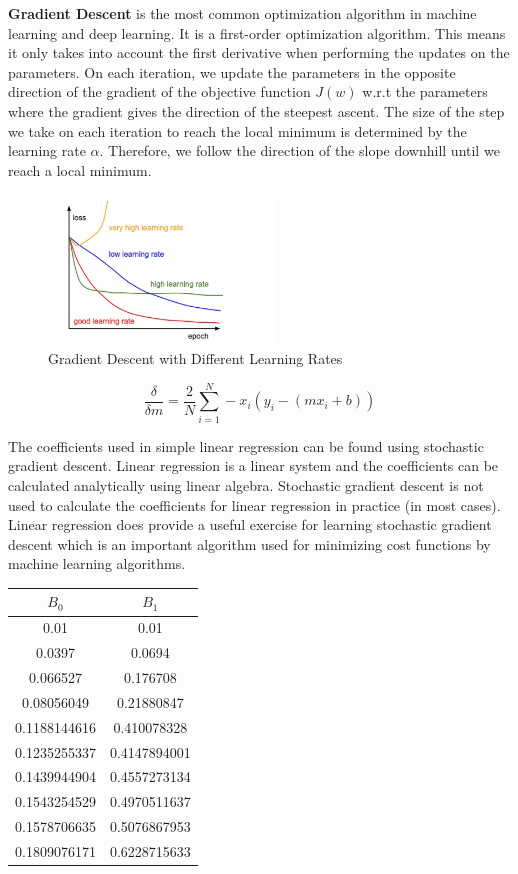 \documentclass[conference,compsoc]{IEEEtran}
\begin{document}
\textbf{Gradient Descent} is the most common optimization algorithm in machine learning and deep learning. It is a first-order optimization algorithm. This means it only takes into account the first derivative when performing the updates on the parameters. On each iteration, we update the parameters in the opposite direction of the gradient of the objective function $J(w)$ w.r.t the parameters where the gradient gives the direction of the steepest ascent. The size of the step we take on each iteration to reach the local minimum is determined by the learning rate $α$. Therefore, we follow the direction of the slope downhill until we reach a local minimum.

\begin{figure}[H]
    \centering
    \includegraphics[width=6cm]{images/gradient-descent-different-learning-rates.png}
    \caption{Gradient Descent with Different Learning Rates}
\end{figure}

\[
    \frac{\delta}{\delta m} = \frac{2}{N} \sum_{i=1}^{N} - x_{i}(y_{i} - (mx_{i} +b))
\]

The coefficients used in simple linear regression can be found using stochastic gradient descent. Linear regression is a linear system and the coefficients can be calculated analytically using linear algebra. Stochastic gradient descent is not used to calculate the coefficients for linear regression in practice (in most cases). Linear regression does provide a useful exercise for learning stochastic gradient descent which is an important algorithm used for minimizing cost functions by machine learning algorithms.

\begin{center}
\begin{tabular}{|c|c|}
    \hline
    $B_{0}$ & $B_{1}$ \\ [0.5ex]
    \hline\hline
    0.01 & 0.01 \\
    \hline
    0.0397 & 0.0694 \\
    \hline
    0.066527 & 0.176708 \\
    \hline
    0.08056049 & 0.21880847 \\
    \hline
    0.1188144616 & 0.410078328 \\
    \hline
    0.1235255337 & 0.4147894001 \\
    \hline
    0.1439944904 & 0.4557273134 \\
    \hline
    0.1543254529 & 0.4970511637 \\
    \hline
    0.1578706635 & 0.5076867953 \\
    \hline
    0.1809076171 & 0.6228715633 \\
    \hline
\end{tabular}
\end{center}
\end{document}
